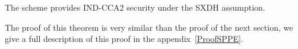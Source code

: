 \begin{myTh}
  The scheme provides IND-CCA2 security under the SXDH assumption.
\end{myTh}


The proof of this theorem is very similar than the proof of the next section, we give a full description of this proof in the appendix~\ref{ProofSPPE}.
